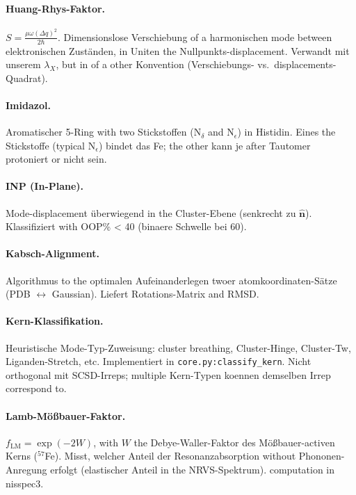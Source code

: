 \documentclass[11pt,a4paper,twoside]{article}
\theoremstyle{remark}
\begin{document}
\paragraph{Huang-Rhys-Faktor.}
$S = \frac{\mu\omega(\Delta q)^2}{2\hbar}$. Dimensionslose
Verschiebung of a harmonischen mode between elektronischen
Zust\"anden, in Uniten the Nullpunkts-displacement. Verwandt mit
unserem $\lambda_X$, but in of a other Konvention
(Verschiebungs- vs.\ displacements-Quadrat).

\paragraph{Imidazol.}
Aromatischer 5-Ring with two Stickstoffen (N$_\delta$ and N$_\epsilon$)
in Histidin. Eines the Stickstoffe (typical N$_\epsilon$) bindet
das Fe; the other kann je after Tautomer protoniert or nicht
sein.

\paragraph{INP (In-Plane).}
Mode-displacement \"uberwiegend in the Cluster-Ebene (senkrecht zu
$\hat{\mathbf{n}}$). Klassifiziert with OOP\% < 40 (binaere
Schwelle bei 60).

\paragraph{Kabsch-Alignment.}
Algorithmus to the optimalen Aufeinanderlegen twoer
atomkoordinaten-S\"atze (PDB $\leftrightarrow$ Gaussian).
Liefert Rotations-Matrix and RMSD.

\paragraph{Kern-Klassifikation.}
Heuristische Mode-Typ-Zuweisung: cluster breathing,
Cluster-Hinge, Cluster-Tw, Liganden-Stretch, etc.
Implementiert in \texttt{core.py:classify\_kern}. Nicht orthogonal
mit SCSD-Irreps; multiple Kern-Typen koennen demselben Irrep
correspond to.

\paragraph{Lamb-M\"o{\ss}bauer-Faktor.}
$f_\text{LM} = \exp(-2W)$, with $W$ the Debye-Waller-Faktor des
M\"o{\ss}bauer-activen Kerns ($^{57}$Fe). Misst, welcher Anteil
der Resonanzabsorption without Phononen-Anregung erfolgt
(elastischer Anteil in the NRVS-Spektrum). computation in nisspec3.
\end{document}

